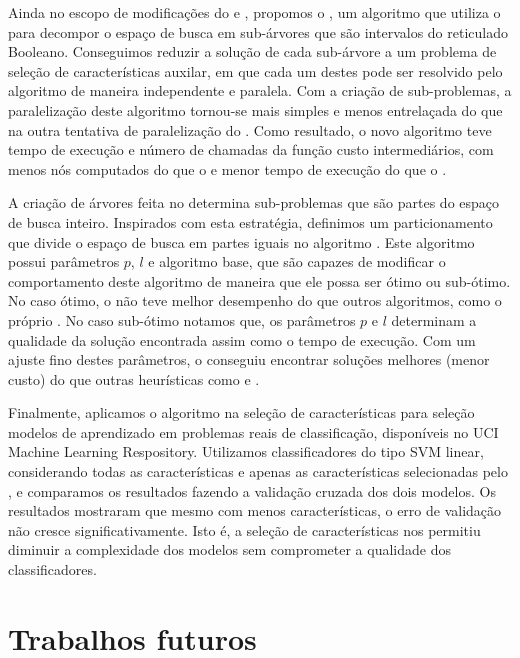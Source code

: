 Ainda no escopo de modificações do  e , 
propomos o , um algoritmo que utiliza o  
para decompor o espaço de busca em sub-árvores que são intervalos
do reticulado Booleano. Conseguimos reduzir a solução de cada sub-árvore
a um problema de seleção de características auxilar, em que cada um 
destes pode ser resolvido pelo algoritmo  de maneira 
independente e paralela. Com a criação de sub-problemas, a paralelização 
deste algoritmo tornou-se mais simples e menos entrelaçada do que na 
outra tentativa de paralelização do . Como resultado, o 
novo algoritmo teve tempo de execução e número de chamadas da função 
custo intermediários, com menos nós computados do que o  e
menor tempo de execução do que o . 

A criação de árvores feita no  determina sub-problemas
que são partes do espaço de busca inteiro. Inspirados com esta 
estratégia, definimos um particionamento que divide o espaço de busca em 
partes iguais no algoritmo . Este algoritmo possui 
parâmetros $p$, $l$ e algoritmo base, que são capazes de modificar o 
comportamento deste algoritmo de maneira que ele possa ser ótimo ou 
sub-ótimo. No caso ótimo, o  não teve melhor desempenho do que outros algoritmos, como
o próprio . No caso sub-ótimo notamos que, os 
parâmetros $p$ e $l$ determinam a qualidade da solução encontrada 
assim como o tempo de execução. Com um ajuste fino destes parâmetros, o
 conseguiu encontrar soluções melhores (menor custo) do 
que outras heurísticas como  e .

Finalmente, aplicamos o algoritmo  na seleção de 
características para seleção modelos de aprendizado em problemas reais
de classificação, disponíveis no UCI Machine Learning Respository. 
Utilizamos classificadores do tipo SVM linear, considerando todas as 
características e apenas as características selecionadas pelo 
, e comparamos os resultados fazendo a validação cruzada
dos dois modelos. Os resultados mostraram que mesmo com menos 
características, o erro de validação não cresce significativamente. Isto 
é, a seleção de características nos permitiu diminuir a complexidade dos
modelos sem comprometer a qualidade dos classificadores.

\section{Trabalhos futuros}

